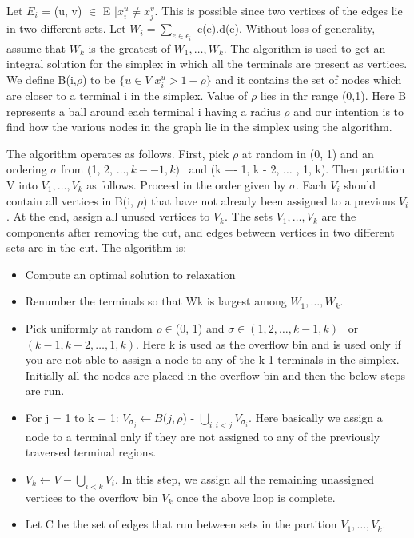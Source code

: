 \documentclass[11pt]{article}
\begin{document}
Let $E_i$ = (u, v) $\in$ E $\vert x_{i}^u \neq x_{j}^v$. This is possible since two vertices of the edges lie in two different sets. Let $W_i = \sum_{e \in \epsilon_i}$ c(e).d(e). Without loss of generality, assume that $W_k$ is the greatest of $W_1, \dots , W_k$. The algorithm is used to get an integral solution for the simplex in which all the terminals are present as vertices. We define B(i,$\rho$) to be $\{u \in V \vert x_i^u > 1 - \rho \}$  and it contains the set of nodes which are closer to a terminal i in the simplex. Value of $\rho$ lies in thr range (0,1). Here B represents a ball around each terminal i having a radius $\rho$ and our intention is to find how the various nodes in the graph lie in the simplex using the algorithm.

The algorithm operates as follows. First, pick $\rho$ at random in (0, 1) and an ordering $\sigma$ from (1, 2, $\dots, k −- 1, k)$ \ and (k −- 1, k - 2, $\dots$ , 1, k). Then partition V into $ V_1, \dots , V_k$ as follows. Proceed in the order given by $\sigma$. Each $V_i$ should contain all vertices in B(i, $\rho$) that have not already been assigned to a previous $V_i$. At the end, assign all unused vertices to $V_k$. The sets $V_1, \dots , V_k$ are the components after removing the cut, and edges between vertices in two different sets are in the cut. The algorithm is:
\begin{itemize} \itemsep -2pt
\item  Compute an optimal solution to relaxation
\item Renumber the terminals so that Wk is largest among $W_1, \dots , W_k$.
\item  Pick uniformly at random $\rho \in $(0, 1) and
$\sigma \in (1, 2, \dots , k - 1, k)$ \ or $ (k - 1, k - 2, \dots , 1, k)$. Here k is used as the overflow bin and is used only if you are not able to assign a node to any of the k-1 terminals in the simplex. Initially all the nodes are placed in the overflow bin and then the below steps are run.
\item For j = 1 to k − 1: $V_{\sigma_j} \leftarrow B(j, \rho$) - $\bigcup_{i:i<j} V_{\sigma_i}$. Here basically we assign a node to a terminal only if they are not assigned to any of the previously traversed terminal regions.\
\item $V_k \leftarrow V - \bigcup_{i<k} V_i$. In this step, we assign all the remaining unassigned vertices to the overflow bin $V_k$ once the above loop is complete.

\item Let C be the set of edges that run between sets in the partition $V_1,\dots , V_k$.
\end{itemize}
\end{document}
